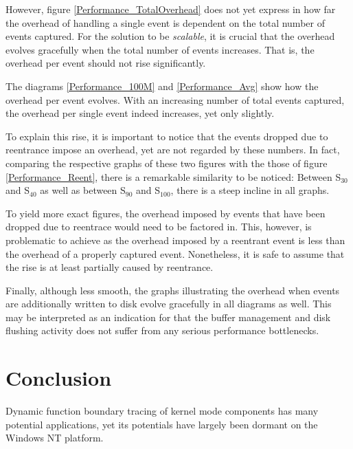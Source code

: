 However, figure \ref{Performance_TotalOverhead} does not yet express in how far the overhead
of handling a single event is dependent on the total number of events captured. For the 
solution to be \emph{scalable}, it is crucial that the overhead evolves gracefully when
the total number of events increases. That is, the overhead per event should not rise
significantly.

The diagrams \ref{Performance_100M} and \ref{Performance_Avg} show how the overhead
per event evolves. With an increasing number of total events captured, the overhead per single event
indeed increases, yet only slightly.



To explain this rise, it is important to notice that the events dropped due
to reentrance impose an overhead, yet are not regarded by these numbers. In fact, comparing
the respective graphs of these two figures with the those of figure \ref{Performance_Reent}, there is a
remarkable similarity to be noticed: Between S$_{30}$ and S$_{40}$ as well as between
S$_{90}$ and S$_{100}$, there is a steep incline in all graphs. 

To yield more exact figures, the overhead imposed by events that have been dropped due
to reentrace would need to be factored in. This, however, is problematic to achieve as 
the overhead imposed by a reentrant event is less than the overhead of a properly captured 
event. Nonetheless, it is safe to assume that the rise is at least partially caused by reentrance. 

Finally, although less smooth, the graphs illustrating the overhead when events are additionally 
written to disk evolve gracefully in all diagrams as well. This may be interpreted as an indication for that
the buffer management and disk flushing activity does not suffer from any serious
performance bottlenecks.



\chapter{Conclusion}
Dynamic function boundary tracing of kernel mode components has many potential applications, 
yet its potentials have largely been dormant on the Windows NT platform.

